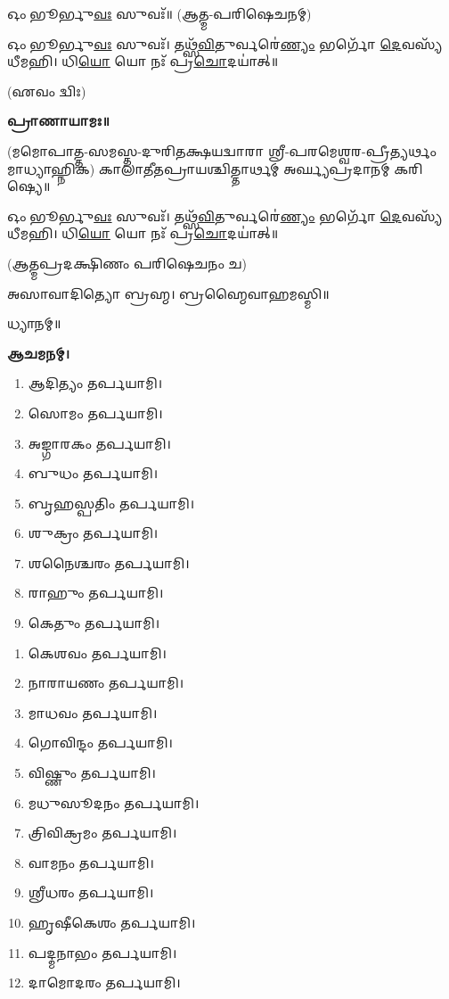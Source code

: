 𑌓𑌂 𑌭𑍂𑌰𑍍𑌭𑍁\-\ul{𑌵𑌃} 𑌸𑍁𑌵𑌃᳴॥ (𑌆𑌤𑍍𑌮-𑌪𑌰𑌿𑌷𑍇𑌚𑌨𑌮𑍍)



𑌓𑌂 𑌭𑍂𑌰𑍍𑌭𑍁\-\ul{𑌵𑌃} 𑌸𑍁𑌵𑌃᳴। 𑌤𑌥𑍍𑌸᳴\-\ul{𑌵𑌿}\-𑌤𑍁𑌰𑍍𑌵𑌰𑍇॑\-\ul{𑌣𑍍𑌯𑌂} 𑌭𑌰𑍍𑌗𑍋᳴ \ul{𑌦𑍇}\-𑌵𑌸𑍍𑌯᳴ 𑌧𑍀𑌮𑌹𑌿। 𑌧𑌿\-\ul{𑌯𑍋} 𑌯𑍋 𑌨𑌃᳴ 𑌪𑍍𑌰\-\ul{𑌚𑍋}\-𑌦𑌯𑌾॑𑌤𑍍॥

\hfill{(𑌏𑌵𑌂 𑌦𑍍𑌵𑌿𑌃)}


\textbf{𑌪𑍍𑌰𑌾𑌣𑌾𑌯𑌾𑌮𑌃॥}

(𑌮𑌮𑍋𑌪𑌾𑌤𑍍𑌤-𑌸𑌮𑌸𑍍𑌤-𑌦𑍁𑌰𑌿𑌤𑌕𑍍𑌷𑌯𑌦𑍍𑌵𑌾𑌰𑌾 𑌶𑍍𑌰𑍀-𑌪𑌰𑌮𑍇𑌶𑍍𑌵𑌰-𑌪𑍍𑌰𑍀𑌤𑍍𑌯𑌰𑍍𑌥𑌂 𑌮𑌾𑌧𑍍𑌯𑌾𑌹𑍍𑌨𑌿𑌕)
𑌕𑌾𑌲𑌾𑌤𑍀𑌤𑌪𑍍𑌰𑌾𑌯𑌶𑍍𑌚𑌿𑌤𑍍𑌤𑌾𑌰𑍍𑌥𑌮𑍍 𑌅𑌰𑍍𑌘𑍍𑌯𑌪𑍍𑌰𑌦𑌾𑌨𑌮𑍍 𑌕𑌰𑌿𑌷𑍍𑌯𑍇॥

𑌓𑌂 𑌭𑍂𑌰𑍍𑌭𑍁\-\ul{𑌵𑌃} 𑌸𑍁𑌵𑌃᳴। 𑌤𑌥𑍍𑌸᳴\-\ul{𑌵𑌿}\-𑌤𑍁𑌰𑍍𑌵𑌰𑍇॑\-\ul{𑌣𑍍𑌯𑌂} 𑌭𑌰𑍍𑌗𑍋᳴ \ul{𑌦𑍇}\-𑌵𑌸𑍍𑌯᳴ 𑌧𑍀𑌮𑌹𑌿। 𑌧𑌿\-\ul{𑌯𑍋} 𑌯𑍋 𑌨𑌃᳴ 𑌪𑍍𑌰\-\ul{𑌚𑍋}\-𑌦𑌯𑌾॑𑌤𑍍॥

(𑌆𑌤𑍍𑌮𑌪𑍍𑌰𑌦𑌕𑍍𑌷𑌿𑌣𑌂 𑌪𑌰𑌿𑌷𑍇𑌚𑌨𑌂 𑌚)


𑌅𑌸𑌾𑌵𑌾𑌦𑌿𑌤𑍍𑌯𑍋 𑌬𑍍𑌰𑌹𑍍𑌮। 𑌬𑍍𑌰𑌹𑍍𑌮𑍈𑌵𑌾𑌹𑌮𑌸𑍍𑌮𑌿॥

𑌧𑍍𑌯𑌾𑌨𑌮𑍍॥

\textbf{𑌆𑌚𑌮𑌨𑌮𑍍।}



\begin{enumerate}
 \item 𑌆𑌦𑌿𑌤𑍍𑌯𑌂 𑌤𑌰𑍍𑌪𑌯𑌾𑌮𑌿।
 \item 𑌸𑍋𑌮𑌂 𑌤𑌰𑍍𑌪𑌯𑌾𑌮𑌿।
 \item 𑌅𑌙𑍍𑌗𑌾𑌰𑌕𑌂 𑌤𑌰𑍍𑌪𑌯𑌾𑌮𑌿।
 \item 𑌬𑍁𑌧𑌂 𑌤𑌰𑍍𑌪𑌯𑌾𑌮𑌿।
 \item 𑌬𑍃𑌹𑌸𑍍𑌪𑌤𑌿𑌂 𑌤𑌰𑍍𑌪𑌯𑌾𑌮𑌿।
 \item 𑌶𑍁𑌕𑍍𑌰𑌂 𑌤𑌰𑍍𑌪𑌯𑌾𑌮𑌿।
 \item 𑌶𑌨𑍈𑌶𑍍𑌚𑌰𑌂 𑌤𑌰𑍍𑌪𑌯𑌾𑌮𑌿।
 \item 𑌰𑌾𑌹𑍁𑌂 𑌤𑌰𑍍𑌪𑌯𑌾𑌮𑌿।
 \item 𑌕𑍇𑌤𑍁𑌂 𑌤𑌰𑍍𑌪𑌯𑌾𑌮𑌿।
\end{enumerate}


\begin{enumerate}
\item 𑌕𑍇𑌶𑌵𑌂 𑌤𑌰𑍍𑌪𑌯𑌾𑌮𑌿।
\item 𑌨𑌾𑌰𑌾𑌯𑌣𑌂 𑌤𑌰𑍍𑌪𑌯𑌾𑌮𑌿।
\item 𑌮𑌾𑌧𑌵𑌂 𑌤𑌰𑍍𑌪𑌯𑌾𑌮𑌿।
\item 𑌗𑍋𑌵𑌿𑌨𑍍𑌦𑌂 𑌤𑌰𑍍𑌪𑌯𑌾𑌮𑌿।
\item 𑌵𑌿𑌷𑍍𑌣𑍁𑌂 𑌤𑌰𑍍𑌪𑌯𑌾𑌮𑌿।
\item 𑌮𑌧𑍁𑌸𑍂𑌦𑌨𑌂 𑌤𑌰𑍍𑌪𑌯𑌾𑌮𑌿।
\item 𑌤𑍍𑌰𑌿𑌵𑌿𑌕𑍍𑌰𑌮𑌂 𑌤𑌰𑍍𑌪𑌯𑌾𑌮𑌿।
\item 𑌵𑌾𑌮𑌨𑌂 𑌤𑌰𑍍𑌪𑌯𑌾𑌮𑌿।
\item 𑌶𑍍𑌰𑍀𑌧𑌰𑌂 𑌤𑌰𑍍𑌪𑌯𑌾𑌮𑌿।
\item 𑌹𑍃𑌷𑍀𑌕𑍇𑌶𑌂 𑌤𑌰𑍍𑌪𑌯𑌾𑌮𑌿।
\item 𑌪𑌦𑍍𑌮𑌨𑌾𑌭𑌂 𑌤𑌰𑍍𑌪𑌯𑌾𑌮𑌿।
\item 𑌦𑌾𑌮𑍋𑌦𑌰𑌂 𑌤𑌰𑍍𑌪𑌯𑌾𑌮𑌿।
\end{enumerate}

